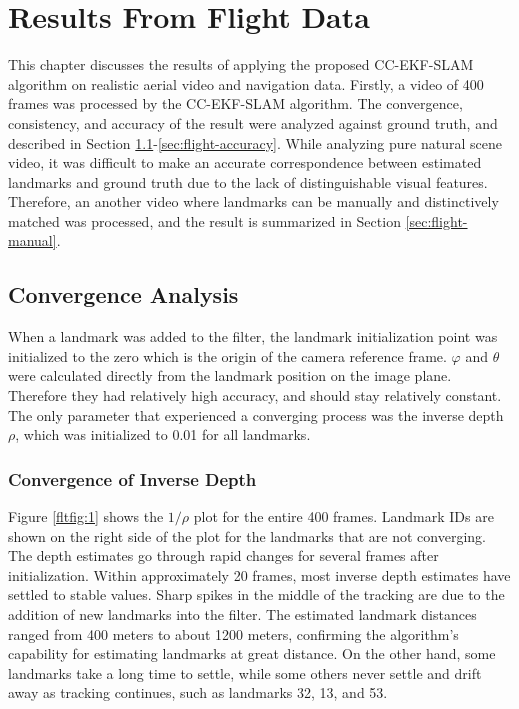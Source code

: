 \chapter{Results From Flight Data}\label{ch:FlightResult}

This chapter discusses the results of applying the proposed
CC-EKF-SLAM algorithm on realistic aerial video and navigation data.
Firstly, a video of 400 frames was processed by the
CC-EKF-SLAM algorithm. The convergence, consistency, and accuracy of
the result were analyzed against ground truth, and described in
Section \ref{sec:flight-converge}-\ref{sec:flight-accuracy}. While
analyzing pure natural scene video, it was difficult to make an accurate
correspondence between estimated landmarks and ground truth due to the
lack of distinguishable visual features. Therefore, an another video
where landmarks can be manually and distinctively matched was
processed, and the result is summarized in Section
\ref{sec:flight-manual}.

\section{Convergence Analysis}\label{sec:flight-converge}
When a landmark was added to the filter, the landmark initialization
point was initialized to the zero which is the origin of the camera
reference frame. $\varphi$ and $\theta$ were calculated directly from
the landmark position on the image plane. Therefore they had relatively
high accuracy, and should stay relatively constant. The only parameter
that experienced a converging process was the inverse depth $\rho$,
which was initialized to 0.01 for all landmarks.

\subsection{Convergence of Inverse Depth}
Figure \ref{fltfig:1} shows the $1/\rho$ plot for the entire 400
frames. Landmark IDs are shown on the right side of the plot for the
landmarks that are not converging. The depth estimates go through
rapid changes for several frames after initialization. Within
approximately 20 frames, most inverse depth estimates have settled to stable
values. Sharp spikes in the middle of the tracking are due to the
addition of new landmarks into the filter. The estimated
landmark distances ranged from 400 meters to about 1200 meters,
confirming the algorithm's capability for estimating landmarks at
great distance. On the other hand, some landmarks take a long time to
settle, while some others never settle and drift away as tracking
continues, such as landmarks 32, 13, and 53.

